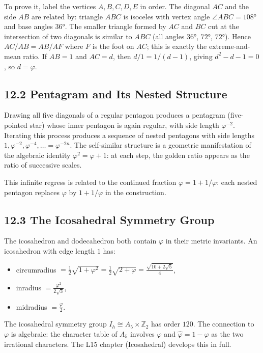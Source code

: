 To prove it, label the vertices $A, B, C, D, E$
in order.
The diagonal $AC$ and the side $AB$ are related by:
triangle $ABC$ is isoceles with vertex angle
$\angle ABC = 108°$ and base angles $36°$.
The smaller triangle formed by $AC$ and $BC$ cut at
the intersection of two diagonals is similar to
$ABC$ (all angles $36°$, $72°$, $72°$).
Hence $AC/AB = AB/AF$ where $F$ is the foot on $AC$;
this is exactly the extreme-and-mean ratio.
If $AB = 1$ and $AC = d$, then $d/1 = 1/(d-1)$,
giving $d^2 - d - 1 = 0$, so $d = \varphi$.

\subsection{12.2 Pentagram and Its Nested Structure}
\label{subsec:gc-pentagram}

Drawing all five diagonals of a regular pentagon
produces a pentagram (five-pointed star) whose
inner pentagon is again regular, with side length
$\varphi^{-2}$.
Iterating this process produces a sequence of
nested pentagons with side lengths $1, \varphi^{-2},
\varphi^{-4}, \ldots = \varphi^{-2n}$.
The self-similar structure is a geometric
manifestation of the algebraic identity
$\varphi^2 = \varphi + 1$: at each step, the
golden ratio appears as the ratio of successive
scales.

This infinite regress is related to the continued
fraction $\varphi = 1 + 1/\varphi$: each nested
pentagon replaces $\varphi$ by $1 + 1/\varphi$ in the
construction.

\subsection{12.3 The Icosahedral Symmetry Group}
\label{subsec:gc-icosahedral}

The icosahedron and dodecahedron both contain
$\varphi$ in their metric invariants.
An icosahedron with edge length $1$ has:
\begin{itemize}
  \item circumradius $= \tfrac{1}{2}\sqrt{1+\varphi^2}
      = \tfrac{1}{2}\sqrt{2+\varphi}
      = \tfrac{\sqrt{10+2\sqrt{5}}}{4}$,
  \item inradius $= \tfrac{\varphi^2}{2\sqrt{3}}$,
  \item midradius $= \tfrac{\varphi}{2}$.
\end{itemize}
The icosahedral symmetry group $I_h \cong A_5 \times \mathbb{Z}_2$
has order $120$.
The connection to $\varphi$ is algebraic: the
character table of $A_5$ involves $\varphi$ and
$\hat\varphi = 1-\varphi$ as the two irrational
characters.
The L15 chapter (Icosahedral) develops this in full.

